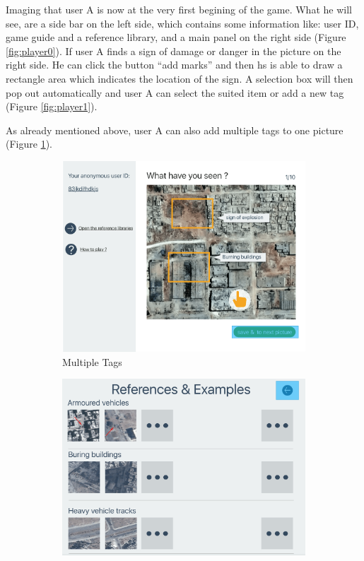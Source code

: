 Imaging that user A is now at the very first begining of the game.
What he will see,
are a side bar on the left side,
which contains some information like:
user ID,
game guide and a reference library,
and a main panel on the right side (Figure \ref{fig:player0}).
If user A finds a sign of damage or danger in the picture on the right side.
He can click the button ``add marks'' and then hs is able to draw a rectangle area which indicates the location of the sign.
A selection box will then pop out automatically and user A can select the suited item or add a new tag (Figure \ref{fig:player1}).

As already mentioned above,
user A can also add multiple tags to one picture (Figure \ref{fig:player2}).

\begin{figure}[H]
    \centering
    \begin{subfigure}[b]{0.45\textwidth}
        \centering
        \includegraphics[width=\textwidth]{figures/function-player-2}
        \caption{Multiple Tags}
        \label{fig:player2}
    \end{subfigure}
    \hfill
    \begin{subfigure}[b]{0.45\textwidth}
        \centering
        \includegraphics[width=\textwidth]{figures/function-player-3}

\end{subfigure}
\end{figure}
